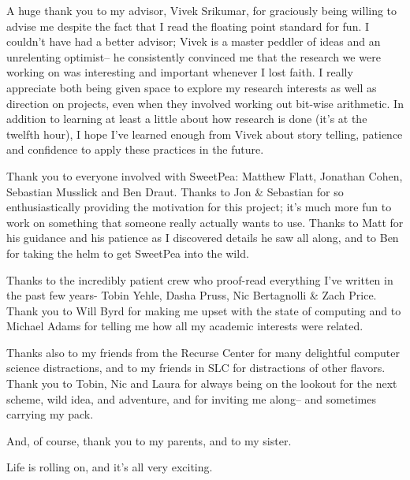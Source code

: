 
A huge thank you to my advisor, Vivek Srikumar, for graciously being willing to advise me despite the fact that I read the floating point standard for fun. I couldn't have had a better advisor; Vivek is a master peddler of ideas and an unrelenting optimist-- he consistently convinced me that the research we were working on was interesting and important whenever I lost faith. I really appreciate both being given space to explore my research interests as well as direction on projects, even when they involved working out bit-wise arithmetic. In addition to learning at least a little about how research is done (it's at the twelfth hour), I hope I've learned enough from Vivek about story telling, patience and confidence to apply these practices in the future.

Thank you to everyone involved with SweetPea: Matthew Flatt, Jonathan Cohen, Sebastian Musslick and Ben Draut. Thanks to Jon \& Sebastian for so enthusiastically providing the motivation for this project; it's much more fun to work on something that someone really actually wants to use. Thanks to Matt for his guidance and his patience as I discovered details he saw all along, and to Ben for taking the helm to get SweetPea into the wild.

Thanks to the incredibly patient crew who proof-read everything I've written in the past few years- Tobin Yehle, Dasha Pruss, Nic Bertagnolli \& Zach Price. Thank you to Will Byrd for making me upset with the state of computing and to Michael Adams for telling me how all my academic interests were related.

Thanks also to my friends from the Recurse Center for many delightful computer science distractions, and to my friends in SLC for distractions of other flavors. Thank you to Tobin, Nic and Laura for always being on the lookout for the next scheme, wild idea, and adventure, and for inviting me along-- and sometimes carrying my pack.

And, of course, thank you to my parents, and to my sister.

Life is rolling on, and it's all very exciting.
